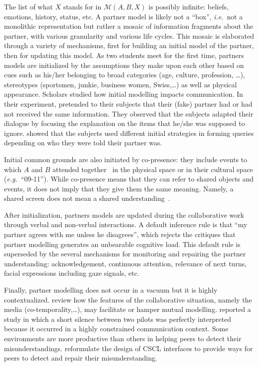 \documentclass[natbib]{svjour3}
\newcommand{\ie}{{\textit{i.e.\ }}}
\newcommand{\eg}{{\textit{e.g.\ }}}
\newcommand{\model}[3]{{$\mathcal{M}(#1, #2, #3)$}}
\begin{document}
The list of what $X$ stands for in \model{A}{B}{X} is possibly infinite:
beliefs, emotions, history, status, etc. A partner model is likely not a
``box'', \ie not a monolithic representation but rather a mosaic of information
fragments about the partner, with various granularity and various life cycles.
This mosaic is elaborated through a variety of mechanisms, first for building an
initial model of the partner, then for updating this model. As two students meet
for the first time, partners models are initialized by the assumptions they make
upon each other based on cues such as his/her belonging to broad categories
(age, culture, profession, \ldots), stereotypes (sportsmen, junkie, business
women, Swiss,\ldots) as well as physical appearance. Scholars studied how
initial modelling impacts communication. In their experiment,
\citet{slugoski1993attribution} pretended to their subjects that their (fake)
partner had or had not received the same information. They observed that the
subjects adapted their dialogue by focusing the explanation on the items that
he/she was supposed to ignore.  \citet{brennan1991conversation} showed that the
subjects used different initial strategies in forming queries depending on who
they were told their partner was.  

Initial common grounds are also initiated by co-presence: they include events to
which $A$ and $B$ attended together~\citep{clark2002definite} in the physical
space or in their cultural space (\eg ``09-11''). While co-presence means that
they can refer to shared objects and events, it does not imply that they give
them the same meaning. Namely, a shared screen does not mean a shared
understanding~\citep{dillenbourg2006sharing}.

After initialization, partners models are updated during the collaborative work
through verbal and non-verbal interactions. A default inference rule is that ``my
partner agrees with me unless he disagrees'', which rejects the critiques that
partner modelling generates an unbearable cognitive load. This default rule is
superseded by the several mechanisms for monitoring and repairing the partner
understanding: acknowledgement, continuous attention, relevance of next turns,
facial expressions including gaze signals, etc.

Finally, partner modelling does not occur in a vacuum but it is highly
contextualized.  \citet{clark1991grounding} review how the features of the
collaborative situation, namely the media (co-temporality,\ldots), may
facilitate or hamper mutual modelling.  \citet{hutchins1997constructing}
reported a study in which a short silence between two pilots was perfectly
interpreted because it occurred in a highly constrained communication context.
Some environments are more productive than others in helping peers to detect
their misunderstandings.  \citet{roschelle1995construction} reformulate the
design of CSCL interfaces to provide ways for peers to detect and repair their
misunderstanding.
\end{document}
